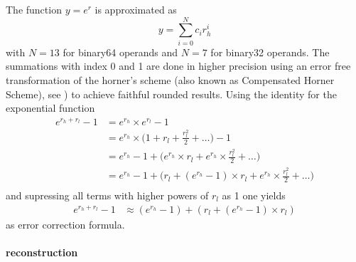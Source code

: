 \documentclass[10pt,a4paper,final,oneside]{article}
\numberwithin{equation}{subsection}
\begin{document}
The function $y = e^r$ is approximated as
\begin{equation}
  y = \sum_{i=0}^{N}c_i r_h^i
\end{equation}
with $N=13$ for binary64 operands and $N=7$ for binary32 operands.
The summations with index 0 and 1 are done in higher precision
using an error free transformation of the horner's scheme
(also known as Compensated Horner Scheme), see \cite{Graillat05compensatedhorner}) to achieve
faithful rounded results.
%
Using the identity for the exponential function
\[
\begin{aligned}
  e^{r_h+r_l} - 1 &=
  e^{r_h} \times e^{r_l} - 1 \\
  &=
  e^{r_h} \times \big( 1+ r_l + \frac{r_l^2}{2} + \dots \big) - 1 \\
  &=
  e^{r_h} -1 + \big( e^{r_h} \times r_l +
  e^{r_h} \times \frac{r_l^2}{2} +
  \dots
  \big) \\
  &=
  e^{r_h} -1 + \big( r_l + (e^{r_h}-1) \times r_l +
  e^{r_h} \times \frac{r_l^2}{2} +
  \dots
  \big) \\
\end{aligned}
\]
and supressing all terms with higher powers of $r_l$ as 1 one yields
\begin{equation}
  \begin{aligned}
    e^{r_h+r_l} - 1 & \approx
    (e^{r_h} -1) + (r_l + (e^{r_h}-1) \times r_l)
  \end{aligned}
\end{equation}
as error correction formula.

\paragraph{reconstruction}
\end{document}
